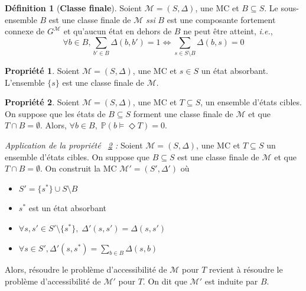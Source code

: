 \documentclass[12pt,a4paper]{report}
\theoremstyle{definition}
\newtheorem{definition}{Définition}[chapter]
\newtheorem{propriete}{Propriété}[chapter]
\theoremstyle{remark}
\newcommand{\ssi}{\textit{ssi} }
\newcommand{\ie}{\textit{i.e.}, }
\let\labelitemi\labelitemii
\begin{document}
\begin{definition}[\textbf{Classe finale}]
	Soient $\mathcal{M} = (S, \Delta)$, une MC et $B \subseteq S$. Le sous-ensemble $B$ est une classe finale de $\mathcal{M}$ \ssi $B$ est une composante fortement connexe de $G^\mathcal{M}$ et qu'aucun état en dehors de $B$ ne peut être atteint, \ie
	\[\forall b \in B, \sum_{b' \in B} \Delta(b, b') = 1 \iff \sum_{s \in S \setminus B} \Delta(b, s) = 0\]
\end{definition}

\begin{propriete}
		Soient $\mathcal{M}=(S, \Delta)$, une MC et $s \in S$ un état absorbant. L'ensemble $\{s\}$ est une classe finale de $\mathcal{M}$.
\end{propriete}

\begin{propriete}\label{BSCC-tip1}
	Soient $\mathcal{M} = (S, \Delta)$, une MC et $T \subseteq S$, un ensemble d'états cibles. On suppose que les états de $B \subseteq S$ forment une classe finale de $\mathcal{M}$ et que $T \cap B = \emptyset$. Alors, $\forall b \in B, \; \mathbb{P}(b \models \Diamond T) = 0$.
\end{propriete}

\textit{Application de la propriété ~\ref{BSCC-tip1} : } Soient $\mathcal{M} = (S, \Delta)$, une MC et $T \subseteq S$ un ensemble d'états cibles. On suppose que $B \subseteq S$ est une classe finale de $\mathcal{M}$ et que $T \cap B = \emptyset$. On construit la MC $\mathcal{M}' = (S', \Delta')$ où 
\begin{itemize}
\renewcommand{\labelitemi}{\tiny$\bullet$}
\item $S' = \{s^*\} \cup S \setminus B$
\item $s^*$ est un état absorbant
\item $\forall s, s' \in S' \setminus \{s^*\}, \; \Delta'(s, s') = \Delta(s, s')$
\item $ \forall s \in S', \Delta'(s, s^*) = \sum_{b \in B} \Delta(s, b)$
\end{itemize}
Alors, résoudre le problème d'accessibilité de $\mathcal{M}$ pour $T$ revient à résoudre le problème d'accessibilité de $\mathcal{M}'$ pour $T$. On dit que $\mathcal{M'}$ est induite par $B$.\\
	
\end{document}
